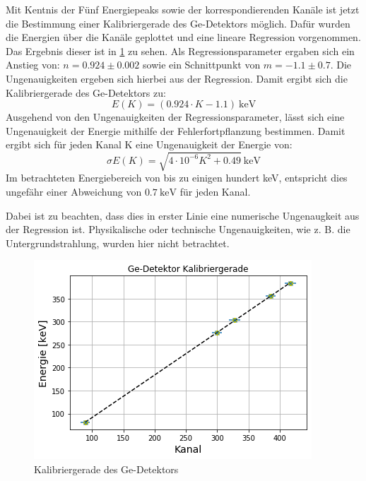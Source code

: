 Mit Kentnis der Fünf Energiepeaks sowie der korrespondierenden Kanäle ist jetzt die Bestimmung einer Kalibriergerade des Ge-Detektors möglich.
Dafür wurden die Energien über die Kanäle geplottet und eine lineare Regression vorgenommen.
Das Ergebnis dieser ist in \ref{Gegerade} zu sehen.
Als Regressionsparameter ergaben sich ein Anstieg von: $n = 0.924 \pm 0.002$ sowie ein Schnittpunkt von $m = -1.1 \pm 0.7$.
Die Ungenauigkeiten ergeben sich hierbei aus der Regression.
Damit ergibt sich die Kalibriergerade des Ge-Detektors zu:
\begin{equation}
E(K) = (0.924 \cdot K - 1.1) \ \si{\kilo\electronvolt}
\end{equation}
Ausgehend von den Ungenauigkeiten der Regressionsparameter, lässt sich eine Ungenauigkeit der Energie mithilfe der Fehlerfortpflanzung bestimmen.
Damit ergibt sich für jeden Kanal K eine Ungenauigkeit der Energie von:
\begin{equation}
\sigma E(K) = \sqrt{4 \cdot 10^{-6} K^2 + 0.49} \ \si{\kilo\electronvolt}
\end{equation}
Im betrachteten Energiebereich von bis zu einigen hundert \si{\kilo\electronvolt}, entspricht dies ungefähr einer Abweichung von $0.7 \ \si{\kilo\electronvolt}$ für jeden Kanal.

Dabei ist zu beachten, dass dies in erster Linie eine numerische Ungenaugkeit aus der Regression ist.
Physikalische oder technische Ungenauigkeiten, wie z. B. die Untergrundstrahlung, wurden hier nicht betrachtet.

\begin{figure}[h!]
  \includegraphics[width=\linewidth]{images/Kalibriergerade1.png}
  \caption{Kalibriergerade des Ge-Detektors}
  \label{Gegerade}
\end{figure}
